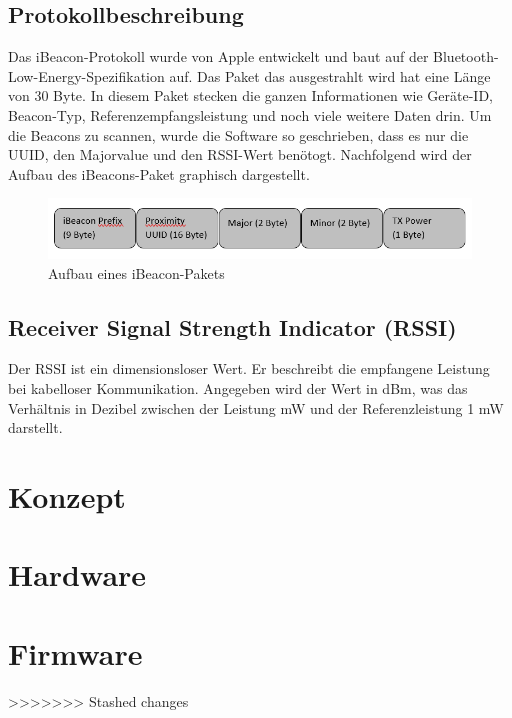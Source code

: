 \subsection{Protokollbeschreibung}
Das iBeacon-Protokoll wurde von Apple entwickelt und baut auf der Bluetooth-Low-Energy-Spezifikation auf. Das Paket das ausgestrahlt wird hat eine Länge von 30 Byte. In diesem Paket stecken die ganzen Informationen wie Geräte-ID, Beacon-Typ, Referenzempfangsleistung und noch viele weitere Daten drin. Um die Beacons zu scannen, wurde die Software so geschrieben, dass es nur die UUID, den Majorvalue und den RSSI-Wert benötogt. Nachfolgend wird der Aufbau des iBeacons-Paket graphisch dargestellt. 


\begin{figure}[htp]
	\centering
	\includegraphics[width=15cm]{Bilder/iBeacon_Paket.PNG}
	 \caption{Aufbau eines iBeacon-Pakets}
	 \label{fig:iBeacon}
\end{figure}

\subsection{Receiver Signal Strength Indicator (RSSI)}
Der RSSI ist ein dimensionsloser Wert. Er beschreibt die empfangene Leistung bei kabelloser Kommunikation. Angegeben wird der Wert in dBm, was das Verhältnis in Dezibel zwischen der Leistung mW und der Referenzleistung 1 mW darstellt. 



\section{Konzept}
\section{Hardware}
\section{Firmware}
>>>>>>> Stashed changes
